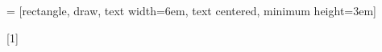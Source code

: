 \usepackage[toc,page]{appendix}



\usepackage{csquotes}
\usepackage[english]{babel}

\addto\captionsenglish{%
  \renewcommand{\contentsname}%
    {Table of contents}%
}

\addto\captionsdanish{%
  \renewcommand{\contentsname}%
    {Indholdsfortegnelse}%
}

\usepackage[nottoc,numbib]{tocbibind}



\usepackage{tikz}
\usetikzlibrary{shapes,arrows,positioning}
 = [rectangle, draw, 
text width=6em, text centered, minimum height=3em]
\usepackage{pdfpages}
\usepackage{environ}
\makeatletter
\newsavebox{\measure@tikzpicture}
[1]{%
  \def\tikz@width{#1}%
  \def\tikzscale{1}\begin{lrbox}{\measure@tikzpicture}%
  \BODY
  \end{lrbox}%
  \edef\tikzscale{\pgfmathresult}%
  \BODY
}
\makeatother


\usepackage{ltablex}
\usepackage{makecell}
\usepackage{multirow}
\usepackage{afterpage}
\usepackage{colortbl}
\renewcommand{\arraystretch}{1.25}



\usepackage{amsmath}  

